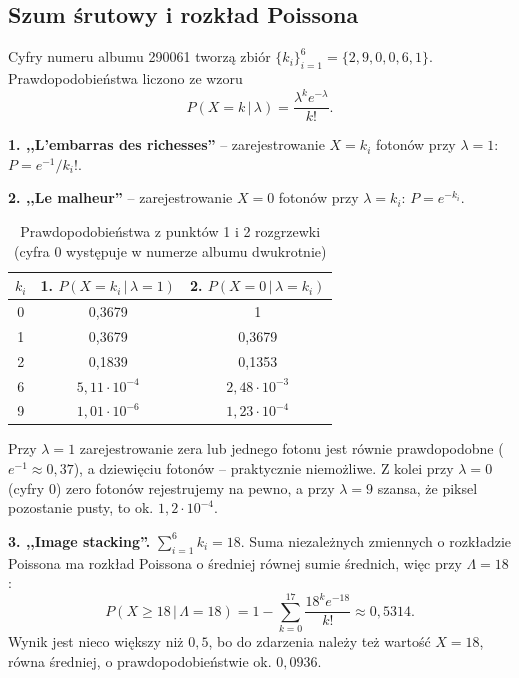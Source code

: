 \documentclass[12pt]{article}
\begin{document}
\subsection{Szum śrutowy i rozkład Poissona}

Cyfry numeru albumu 290061 tworzą zbiór $\{k_i\}_{i=1}^{6} = \{2, 9, 0, 0, 6, 1\}$. Prawdopodobieństwa liczono ze wzoru
\[
    P(X=k\,|\,\lambda) = \frac{\lambda^k e^{-\lambda}}{k!}.
\]

\textbf{1. ,,L'embarras des richesses''} -- zarejestrowanie $X = k_i$ fotonów przy $\lambda = 1$: $P = e^{-1}/k_i!$.

\textbf{2. ,,Le malheur''} -- zarejestrowanie $X = 0$ fotonów przy $\lambda = k_i$: $P = e^{-k_i}$.

\begin{table}[H]
    \centering
    \begin{tabular}{|c|c|c|}
        \hline
        $k_i$ & \textbf{1.} $P(X=k_i\,|\,\lambda=1)$ & \textbf{2.} $P(X=0\,|\,\lambda=k_i)$ \\
        \hline
        0 & 0,3679 & 1 \\
        1 & 0,3679 & 0,3679 \\
        2 & 0,1839 & 0,1353 \\
        6 & $5{,}11\cdot10^{-4}$ & $2{,}48\cdot10^{-3}$ \\
        9 & $1{,}01\cdot10^{-6}$ & $1{,}23\cdot10^{-4}$ \\
        \hline
    \end{tabular}
    \caption{Prawdopodobieństwa z punktów 1 i 2 rozgrzewki (cyfra 0 występuje w numerze albumu dwukrotnie)}
    \label{tab:poisson}
\end{table}

Przy $\lambda = 1$ zarejestrowanie zera lub jednego fotonu jest równie prawdopodobne ($e^{-1}\approx 0{,}37$), a dziewięciu fotonów -- praktycznie niemożliwe. Z kolei przy $\lambda = 0$ (cyfry 0) zero fotonów rejestrujemy na pewno, a przy $\lambda = 9$ szansa, że piksel pozostanie pusty, to ok. $1{,}2\cdot10^{-4}$.

\textbf{3. ,,Image stacking''.} $\sum_{i=1}^6 k_i = 18$. Suma niezależnych zmiennych o rozkładzie Poissona ma rozkład Poissona o średniej równej sumie średnich, więc przy $\Lambda = 18$:
\[
    P(X \geq 18\,|\,\Lambda = 18) = 1 - \sum_{k=0}^{17} \frac{18^k e^{-18}}{k!} \approx 0{,}5314.
\]
Wynik jest nieco większy niż $0{,}5$, bo do zdarzenia należy też wartość $X = 18$, równa średniej, o prawdopodobieństwie ok. $0{,}0936$.
\end{document}

